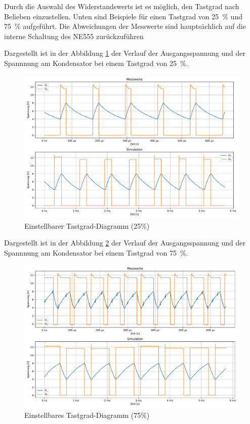 Durch die Auswahl des Widerstandswerts ist es möglich, den Tastgrad nach Belieben einzustellen. Unten sind Beispiele für einen Tastgrad von \SI{25}{\percent} und \SI{75}{\percent} aufgeführt. Die Abweichungen der Messwerte sind hauptsächlich auf die interne Schaltung des NE555 zurückzuführen

%
Dargestellt ist in der Abbildung \ref{fig:einstellbaretastgrad25} der Verlauf der Ausgangsspannung und der Spannnung am Kondensator bei einem Tastgrad von \SI{25}{\percent}.
%
\begin{figure}[H]
  \centering
  \includegraphics[width=\linewidth]{Elektronik-Laborprotokoll_Filter/Plots/einstellbaretastgrad25.pdf}
  \caption{Einstellbarer Tastgrad-Diagramm (25\%)}
  \label{fig:einstellbaretastgrad25}
\end{figure}



%
Dargestellt ist in der Abbildung \ref{fig:einstellbaretastgrad75} der Verlauf der Ausgangsspannung und der Spannnung am Kondensator bei einem Tastgrad von \SI{75}{\percent}.
\begin{figure}[H]
  \centering
  \includegraphics[width=\linewidth]{Elektronik-Laborprotokoll_Filter/Plots/einstellbaretastgrad75.pdf}
  \caption{Einstellbares Tastgrad-Diagramm (75\%)}
  \label{fig:einstellbaretastgrad75}
\end{figure}

